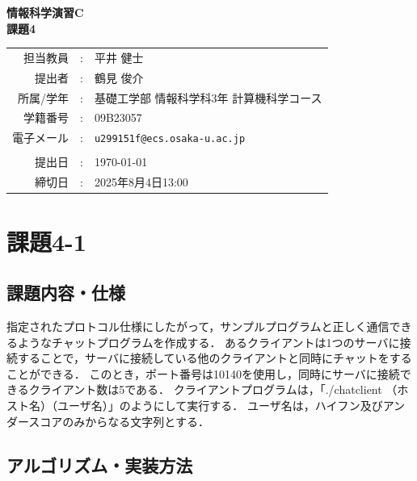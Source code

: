 \documentclass[a4j,10pt]{jarticle}
\makeatletter
\newcommand{\teacherName}{平井 健士}
\newcommand{\studentName}{鶴見 俊介}
\newcommand{\studentAff}{基礎工学部 情報科学科3年 計算機科学コース}
\newcommand{\studentID}{09B23057}
\newcommand{\studentEmail}{u299151f@ecs.osaka-u.ac.jp}
\newcommand{\submitted}{\today}
\newcommand{\deadline}{2025年8月4日13:00}
\makeatother
\begin{document}
\begin{titlepage}
\begin{center}
{\Huge\bfseries 情報科学演習C} \\
\vspace{1cm}
{\LARGE\bfseries 課題4}
\vspace{5cm}

{\large
\begin{tabular}{rcl}
担当教員 & : & \teacherName \\
提出者   & : & \studentName \\
所属/学年   & : & \studentAff\\
学籍番号 & : & \studentID \\
電子メール & : & \texttt{\studentEmail}\\
&& \\
提出日 & : & \submitted \\
締切日 & : & \deadline
\end{tabular}
}
\end{center}
\end{titlepage}

\setcounter{tocdepth}{2}
\tableofcontents
\newpage


% 

\section{課題4-1}
\subsection{課題内容・仕様}
指定されたプロトコル仕様にしたがって，サンプルプログラムと正しく通信できるようなチャットプログラムを作成する．
あるクライアントは1つのサーバに接続することで，サーバに接続している他のクライアントと同時にチャットをすることができる．
このとき，ポート番号は10140を使用し，同時にサーバに接続できるクライアント数は5である．
クライアントプログラムは，「./chatclient （ホスト名）（ユーザ名）」のようにして実行する．
ユーザ名は，ハイフン及びアンダースコアのみからなる文字列とする．
\subsection{アルゴリズム・実装方法}
\end{document}
